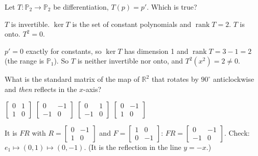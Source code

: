 \begin{question}[id=lt-4, marks=2]
Let $T : \mathbb{P}_2 \to \mathbb{P}_2$ be differentiation, $T(p) = p'$. Which is true?
\begin{options}
  \option $T$ is invertible.
  \correct $\ker T$ is the set of constant polynomials and $\operatorname{rank} T = 2$.
  \option $T$ is onto.
  \option $T^2 = 0$.
\end{options}
\begin{solution}
$p' = 0$ exactly for constants, so $\ker T$ has dimension 1 and $\operatorname{rank} T = 3 - 1 = 2$ (the range is $\mathbb{P}_1$). So $T$ is neither invertible nor onto, and $T^2(x^2) = 2 \ne 0$.
\end{solution}
\end{question}

\begin{question}[id=lt-5, marks=2]
What is the standard matrix of the map of $\mathbb{R}^2$ that rotates by $90^\circ$ anticlockwise and \emph{then} reflects in the $x$-axis?
\begin{options}
  \option $\begin{bmatrix} 0 & 1 \\ 1 & 0 \end{bmatrix}$
  \correct $\begin{bmatrix} 0 & -1 \\ -1 & 0 \end{bmatrix}$
  \option $\begin{bmatrix} 0 & 1 \\ -1 & 0 \end{bmatrix}$
  \option $\begin{bmatrix} 0 & -1 \\ 1 & 0 \end{bmatrix}$
\end{options}
\begin{solution}
It is $FR$ with $R = \begin{bmatrix} 0 & -1 \\ 1 & 0 \end{bmatrix}$ and $F = \begin{bmatrix} 1 & 0 \\ 0 & -1 \end{bmatrix}$: $FR = \begin{bmatrix} 0 & -1 \\ -1 & 0 \end{bmatrix}$. Check: $e_1 \mapsto (0, 1) \mapsto (0, -1)$. (It is the reflection in the line $y = -x$.)
\end{solution}
\end{question}

